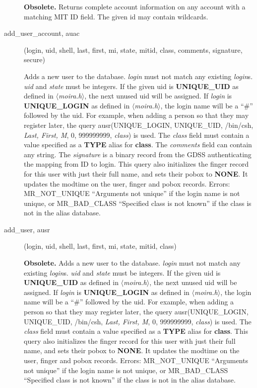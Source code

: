 \documentclass{article}
\begin{document}
\begin{description}
{\bf Obsolete.}  Returns complete account information on any account
with a matching MIT ID field.  The given id may contain wildcards.

\item[add\_user\_account, auac](login, uid, shell, last, first, mi, state, mitid,
class, comments, signature, secure)

Adds a new user to the database. {\em login} must not match any
existing {\em login}s. {\em uid} and {\em state} must be integers. If
the given uid is {\bf UNIQUE\_UID} as defined in {\em
$\langle$moira.h$\rangle$}, the next unused uid will be assigned. If
{\em login} is {\bf UNIQUE\_LOGIN} as defined in {\em
$\langle$moira.h$\rangle$}, the login name will be a ``\#'' followed by
the uid. For example, when adding a person so that they may register
later, the query ausr(UNIQUE\_LOGIN, UNIQUE\_UID, /bin/csh, {\em Last,
First, M}, 0, 999999999, {\em class}) is used. The {\em class}
field must contain a value specified as a {\bf TYPE} alias for {\bf
class}. The {\em comments} field can contain any string. The {\em
signature} is a binary record from the GDSS authenticating the mapping
from ID to login. This query also initializes the finger record for
this user with just their full name, and sets their pobox to {\bf
NONE}. It updates the modtime on the user, finger and pobox records.
Errors: MR\_NOT\_UNIQUE ``Arguments not unique'' if the login name is not
unique, or MR\_BAD\_CLASS ``Specified class is not known'' if the class is
not in the alias database.

\item[add\_user, ausr](login, uid, shell, last, first, mi, state, mitid,
class)

{\bf Obsolete.} Adds a new user to the database. {\em login} must not
match any existing {\em login}s. {\em uid} and {\em state} must be
integers. If the given uid is {\bf UNIQUE\_UID} as defined in {\em
$\langle$moira.h$\rangle$}, the next unused uid will be assigned. If
{\em login} is {\bf UNIQUE\_LOGIN} as defined in {\em
$\langle$moira.h$\rangle$}, the login name will be a ``\#'' followed by
the uid. For example, when adding a person so that they may register
later, the query ausr(UNIQUE\_LOGIN, UNIQUE\_UID, /bin/csh, {\em Last,
First, M}, 0, 999999999, {\em class}) is used. The {\em class} field
must contain a value specified as a {\bf TYPE} alias for {\bf class}.
This query also initializes the finger record for this user with just
their full name, and sets their pobox to {\bf NONE}. It updates the
modtime on the user, finger and pobox records. Errors: MR\_NOT\_UNIQUE
``Arguments not unique'' if the login name is not unique, or
MR\_BAD\_CLASS ``Specified class is not known'' if the class is not in the
alias database.


\end{description}
\end{document}

